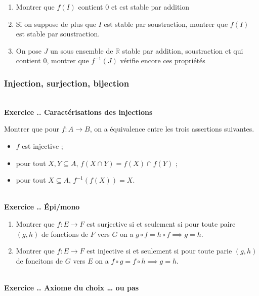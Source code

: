 \documentclass{article}
\newcommand{\mb}[1]{\mathbb{#1}}
\newcounter{exo}
\newcommand{\exercice}[1][\null]{\textbf{\\ Exercice \thesection.\theexo. #1} \addtocounter{exo}{1}}
\begin{document}
\begin{enumerate}
    \item Montrer que $f(I)$ contient $0$
        et est stable par addition
    \item Si on suppose de plus que $I$ est 
        stable par soustraction, montrer 
        que $f(I)$ est stable par soustraction.
    \item On pose $J$ un sous ensemble de $\mb{R}$
        stable par addition, soustraction et qui 
        contient $0$, montrer que $f^{-1}(J)$
        vérifie encore ces propriétés 
\end{enumerate}




\subsubsection{Injection, surjection, bijection}

\exercice[Caractérisations des injections]

Montrer que pour $f : A \rightarrow B$, on a équivalence entre les trois assertions suivantes.

\begin{itemize}

\item $f$ est injective ;

\item pour tout $X,Y \subseteq A$, $f(X \cap Y) = f(X) \cap f(Y)$ ;

\item pour tout $X \subseteq A$, $f^{-1}(f(X)) = X$.

\end{itemize} 

\exercice[Épi/mono]

\begin{enumerate}
    \item Montrer que $f: E \to F$ est surjective 
        si et seulement si 
        pour toute paire $(g,h)$ de fonctions de $F$ vers $G$
        on a $g \circ f = h \circ f \implies g = h$.

    \item Montrer que $f : E \to F$ est injective 
        si et seulement si 
        pour toute parie $(g,h)$ de foncitons de $G$ vers $E$
        on a $f \circ g = f \circ h \implies g = h$.
\end{enumerate}



\exercice[Axiome du choix \dots{} ou pas]
\end{document}

